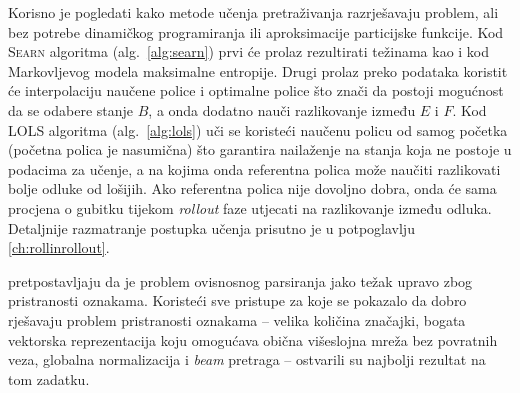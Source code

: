 Korisno je pogledati kako metode učenja pretraživanja razrješavaju problem, ali
bez potrebe dinamičkog programiranja ili aproksimacije particijske funkcije. Kod
\textsc{Searn} algoritma (alg.~\ref{alg:searn}) prvi će prolaz rezultirati
težinama kao i kod Markovljevog modela maksimalne entropije. Drugi prolaz preko
podataka koristit će interpolaciju naučene police i optimalne police što znači
da postoji mogućnost da se odabere stanje $B$, a onda dodatno nauči razlikovanje
između $E$ i $F$. Kod \textsc{LOLS} algoritma (alg.~\ref{alg:lols}) uči se
koristeći naučenu policu od samog početka (početna polica je nasumična) što
garantira nailaženje na stanja koja ne postoje u podacima za učenje, a na kojima
onda referentna polica može naučiti razlikovati bolje odluke od lošijih. Ako
referentna polica nije dovoljno dobra, onda će sama procjena o gubitku tijekom
\textit{rollout} faze utjecati na razlikovanje između odluka. Detaljnije
razmatranje postupka učenja prisutno je u potpoglavlju \ref{ch:rollinrollout}.

\citet{andor2016globally} pretpostavljaju da je problem ovisnosnog parsiranja
jako težak upravo zbog pristranosti oznakama. Koristeći sve pristupe za koje se
pokazalo da dobro rješavaju problem pristranosti oznakama -- velika količina
značajki, bogata vektorska reprezentacija koju omogućava obična višeslojna mreža
bez povratnih veza, globalna normalizacija i \textit{beam} pretraga -- ostvarili
su najbolji rezultat na tom zadatku.
